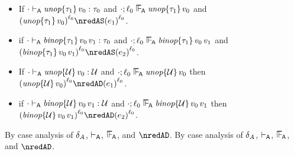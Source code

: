 \begin{lemma}\label{A-delta-label-progress}\leavevmode
  \begin{itemize}
    \item
      If\/ ${\cdot} \vdash_{\mathsf{A}} \textit{unop}{\{\tau_1\}}\,v_0 : \tau_0$
      and\/ $\snil; \sowner_0 \sWLA \eunopt{\stype_1}{\svalue_0}$
      and\/ $\obars{\eunopt{\stype_1}{\svalue_0}}{\sowner_0} \nredAS \obars{\sexpr_1}{\sowner_0}$.
    \item
      if\/ ${\cdot} \vdash_{\mathsf{A}} \textit{binop}{\{\tau_1\}}\,v_0\,v_1 : \tau_0$
      and\/ $\snil; \sowner_0 \sWLA \ebinopt{\stype_1}{\svalue_0}{\svalue_1}$
      and\/ $\obars{\ebinopt{\stype_1}{\svalue_0}{\svalue_1}}{\sowner_0} \nredAS \obars{\sexpr_2}{\sowner_0}$.
    \item
      If\/ ${\cdot} \vdash_{\mathsf{A}} \textit{unop}{\{{\mathcal U}\}}\,v_0 : {\mathcal U}$
      and\/ $\snil; \sowner_0 \sWLA \eunopt{\tdyn}{\svalue_0}$
      then\/ $\obars{\eunopt{\tdyn}{\svalue_0}}{\sowner_0} \nredAD \obars{\sexpr_1}{\sowner_0}$.
    \item
      if\/ ${\cdot} \vdash_{\mathsf{A}} \textit{binop}{\{{\mathcal U}\}}\,v_0\,v_1 : {\mathcal U}$
      and\/ $\snil; \sowner_0 \sWLA \ebinopt{\tdyn}{\svalue_0}{\svalue_1}$
      then\/ $\obars{\ebinopt{\tdyn}{\svalue_0}{\svalue_1}}{\sowner_0} \nredAD \obars{\sexpr_2}{\sowner_0}$.
  \end{itemize}
\end{lemma}{
  \newcommand{\shortpf}{By case analysis of $\sdeltaA$, $\sWTA$, $\sWLA$, and $\nredAD$.}
\begin{lamportproof*}
  \shortpf
\mainproof
  \shortpf


\end{lamportproof*}}
